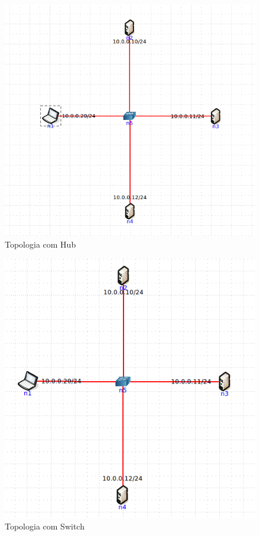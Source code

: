 \documentclass{llncs}
\begin{document}
\begin{figure}[H]
\begin{center}
\includegraphics[scale=0.45]{17_topologia.png} 
\end{center}
\caption{\label{fig:17_topologia}Topologia com Hub}
\end{figure} 
\par

\begin{figure}[H]
\begin{center}
\includegraphics[scale=0.45]{18_topologia.png} 
\end{center}
\caption{\label{fig:18_topologia}Topologia com Switch}
\end{figure} 
\par
\end{document}

